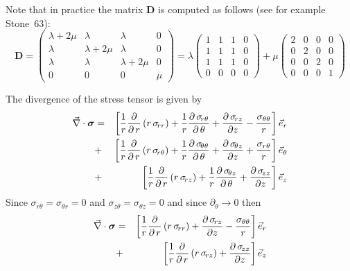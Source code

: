 

Note that in practice the matrix ${\bm D}$ is computed as follows (see for example Stone~63):
\[
{\bm D}
=
\left(
\begin{array}{cccc}
\lambda+2\mu & \lambda & \lambda & 0  \\
\lambda & \lambda+2\mu & \lambda & 0  \\
\lambda & \lambda & \lambda+2\mu & 0  \\
0 & 0 & 0 & \mu 
\end{array}
\right)
=
\lambda
\left(
\begin{array}{cccc}
1 & 1 & 1 & 0  \\
1 & 1 & 1 & 0  \\
1 & 1 & 1 & 0  \\
0 & 0 & 0 & 0 
\end{array}
\right)
+
\mu
\left(
\begin{array}{cccc}
2 & 0 & 0 & 0 \\
0 & 2 & 0 & 0 \\
0 & 0 & 2 & 0 \\
0 & 0 & 0 & 1  
\end{array}
\right)
\]


The divergence of the stress tensor is given by
\begin{eqnarray}
\vec\nabla \cdot {\bm \sigma}
& = &
\left[ {1 \over r} {\partial \over \partial \, r} \left( r \, \sigma_{\!rr} \right) + 
{1 \over r} {\partial \, \sigma_{\!r\theta} \over \partial \, \theta} +
{\partial \, \sigma_{\!rz} \over \partial z} - {\sigma_{\theta \theta} \over r} \right] \vec{ e}_r \\
& + &
\left[ {1 \over r} {\partial \over \partial \, r} \left( r \, \sigma_{\!r\theta} \right) + 
{1 \over r} {\partial \, \sigma_{\!\theta\theta} \over \partial \, \theta} +
{\partial \, \sigma_{\!\theta z} \over \partial z} + {\sigma_{r \theta} \over r} \right] \vec{e}_\theta \\
& + &
\left[ {1 \over r} {\partial \over \partial \, r} \left( r \, \sigma_{\!rz} \right) + 
{1 \over r} {\partial \, \sigma_{\!\theta z} \over \partial \, \theta} +
{\partial \, \sigma_{\!zz} \over \partial z} \right] \vec{e}_z
\end{eqnarray}
Since $\sigma_{r\theta}=\sigma_{\theta r}=0$ 
and $\sigma_{z\theta}=\sigma_{\theta z}=0$
and since $\partial_\theta \rightarrow 0$
then 
\begin{eqnarray}
\vec\nabla \cdot {\bm \sigma}
& = &
\left[ {1 \over r} {\partial \over \partial \, r} \left( r \, \sigma_{\!rr} \right) + 
{\partial \, \sigma_{\!rz} \over \partial z} - {\sigma_{\theta \theta} \over r} \right] \vec{ e}_r \\
& + &
\left[ {1 \over r} {\partial \over \partial \, r} \left( r \, \sigma_{\!rz} \right) 
 +
{\partial \, \sigma_{\!zz} \over \partial z} \right] \vec{e}_z
\end{eqnarray}

